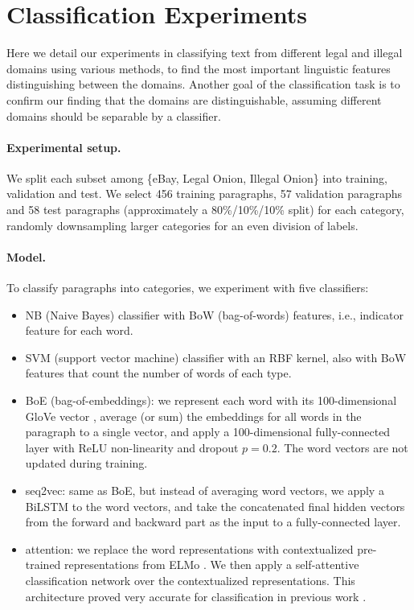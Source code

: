\documentclass[11pt,a4paper,table]{article}
\begin{document}
\section{Classification Experiments} \label{sec:classification}

Here we detail our experiments in classifying text from different legal and
illegal domains using various methods, to find the most important linguistic features
distinguishing between the domains. Another goal of the classification task is to confirm our finding that the domains are distinguishable, assuming different domains should be separable by a classifier.

\paragraph{Experimental setup.}

We split each subset among
\{eBay, Legal Onion, Illegal Onion\}
into training, validation and test.
We select 456 training paragraphs, 57 validation paragraphs and
58 test paragraphs (approximately a 80\%/10\%/10\% split) for each category,
randomly downsampling larger categories for an even division of labels.

\paragraph{Model.}

To classify paragraphs into categories, we experiment with five classifiers:

\begin{itemize}
  \item NB (Naive Bayes) classifier
  with BoW (bag-of-words) features, i.e., indicator feature for each word.
  \item SVM (support vector machine) classifier with an RBF kernel,
  also with BoW features that count the number of words of each type.
  \item BoE (bag-of-embeddings): we represent each word with its 100-dimensional
  GloVe vector \cite{pennington2014glove}, average (or sum) the embeddings for all words in the paragraph
  to a single vector, and apply a 100-dimensional fully-connected layer with
  ReLU non-linearity and dropout $p=0.2$.
  The word vectors are not updated during training.
  \item seq2vec: same as BoE, but instead of averaging word vectors,
  we apply a BiLSTM to the word vectors, and take the concatenated
  final hidden vectors from the forward and backward part as the input to a
  fully-connected layer.
  \item attention: we replace the word representations with contextualized
  pre-trained representations from ELMo \cite{Peters:2018}. We then apply a self-attentive
  classification network \cite{mccann2017learned} over the contextualized representations. This architecture proved very accurate for classification in
  previous work \cite{W18-5427,D18-1401}.
\end{itemize}
\end{document}
